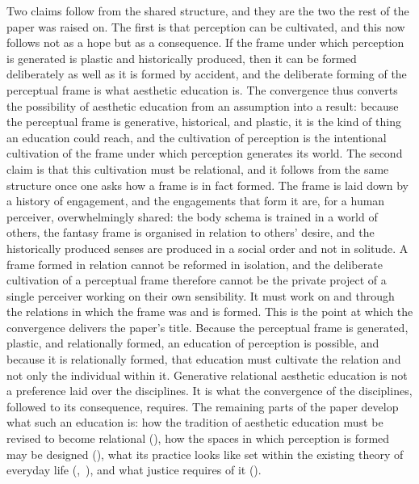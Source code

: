 Two claims follow from the shared structure, and they are the two the rest of the paper was raised on. The first is that perception can be cultivated, and this now follows not as a hope but as a consequence. If the frame under which perception is generated is plastic and historically produced, then it can be formed deliberately as well as it is formed by accident, and the deliberate forming of the perceptual frame is what aesthetic education is. The convergence thus converts the possibility of aesthetic education from an assumption into a result: because the perceptual frame is generative, historical, and plastic, it is the kind of thing an education could reach, and the cultivation of perception is the intentional cultivation of the frame under which perception generates its world. The second claim is that this cultivation must be relational, and it follows from the same structure once one asks how a frame is in fact formed. The frame is laid down by a history of engagement, and the engagements that form it are, for a human perceiver, overwhelmingly shared: the body schema is trained in a world of others, the fantasy frame is organised in relation to others' desire, and the historically produced senses are produced in a social order and not in solitude. A frame formed in relation cannot be reformed in isolation, and the deliberate cultivation of a perceptual frame therefore cannot be the private project of a single perceiver working on their own sensibility. It must work on and through the relations in which the frame was and is formed. This is the point at which the convergence delivers the paper's title. Because the perceptual frame is generated, plastic, and relationally formed, an education of perception is possible, and because it is relationally formed, that education must cultivate the relation and not only the individual within it. Generative relational aesthetic education is not a preference laid over the disciplines. It is what the convergence of the disciplines, followed to its consequence, requires. The remaining parts of the paper develop what such an education is: how the tradition of aesthetic education must be revised to become relational (), how the spaces in which perception is formed may be designed (), what its practice looks like set within the existing theory of everyday life (,~), and what justice requires of it ().
